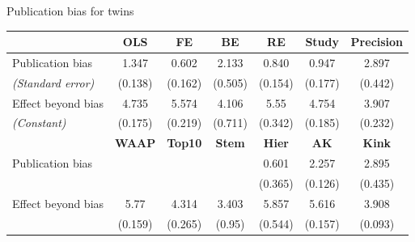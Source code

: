 \documentclass{beamer} %
\begin{document}
\begin{frame}{Publication bias for twins}
    \begin{tiny}
        \begin{table}[!htbp]
            \begin{tabular}{
                    @{}
                    l*{6}{c}} %
                \toprule
                \multicolumn{1}{c}{}                  &
                \textbf{OLS}                          &
                \textbf{FE}                           &
                \textbf{BE}                           &
                \textbf{RE}                           &
                \textbf{Study}                        &
                \textbf{Precision}                                                                                \\
                \midrule

                Publication bias                      & 1.347   & 0.602   & 2.133   & 0.840   & 0.947   & 2.897   \\
                \emph{\hspace{0.2cm}(Standard error)} & (0.138) & (0.162) & (0.505) & (0.154) & (0.177) & (0.442) \\
                \addlinespace[0.5em]
                Effect beyond bias                    & 4.735   & 5.574   & 4.106   & 5.55    & 4.754   & 3.907   \\
                \emph{\hspace{0.2cm}(Constant)}       & (0.175) & (0.219) & (0.711) & (0.342) & (0.185) & (0.232) \\

                \midrule

                                                      &
                \textbf{WAAP}                         &
                \textbf{Top10}                        &
                \textbf{Stem}                         &
                \textbf{Hier}                         &
                \textbf{AK}                           &
                \textbf{Kink}                                                                                     \\
                \midrule
                Publication bias                      &         &         &         & 0.601   & 2.257   & 2.895   \\
                                                      &         &         &         & (0.365) & (0.126) & (0.435) \\
                \addlinespace[0.5em]
                Effect beyond bias                    & 5.77    & 4.314   & 3.403   & 5.857   & 5.616   & 3.908   \\
                                                      & (0.159) & (0.265) & (0.95)  & (0.544) & (0.157) & (0.093) \\


\end{tabular}
\end{table}
\end{tiny}
\end{frame}
\end{document}
